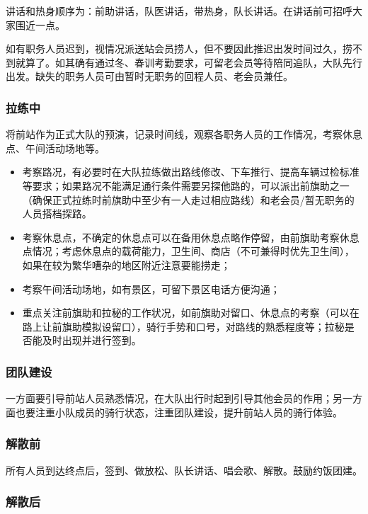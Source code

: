 \documentclass[UTF8]{ctexart}
\begin{document}
讲话和热身顺序为：前助讲话，队医讲话，带热身，队长讲话。在讲话前可招呼大家围近一点。

如有职务人员迟到，视情况派送站会员捞人，但不要因此推迟出发时间过久，捞不到就算了。如其确有通过冬、春训考勤要求，可留老会员等待陪同追队，大队先行出发。缺失的职务人员可由暂时无职务的回程人员、老会员兼任。

\subsubsection{拉练中}

将前站作为正式大队的预演，记录时间线，观察各职务人员的工作情况，考察休息点、午间活动场地等。

\begin{itemize}[nosep,left=4em]
    \item 考察路况，有必要时在大队拉练做出路线修改、下车推行、提高车辆过检标准等要求；如果路况不能满足通行条件需要另探他路的，可以派出前旗助之一（确保正式拉练时前旗助中至少有一人走过相应路线）和老会员/暂无职务的人员搭档探路。
    \item 考察休息点，不确定的休息点可以在备用休息点略作停留，由前旗助考察休息点情况；考虑休息点的载荷能力，卫生间、商店（不可兼得时优先卫生间），如果在较为繁华嘈杂的地区附近注意要能捞走；
    \item 考察午间活动场地，如有景区，可留下景区电话方便沟通；
    \item 重点关注前旗助和拉秘的工作状况，如前旗助对留口、休息点的考察（可以在路上让前旗助模拟设留口），骑行手势和口号，对路线的熟悉程度等；拉秘是否能及时出现并进行签到。
\end{itemize}

\subsubsection{团队建设}

一方面要引导前站人员熟悉情况，在大队出行时起到引导其他会员的作用；另一方面也要注重小队成员的骑行状态，注重团队建设，提升前站人员的骑行体验。

\subsubsection{解散前}

所有人员到达终点后，签到、做放松、队长讲话、唱会歌、解散。鼓励约饭团建。

\subsubsection{解散后}
\end{document}
